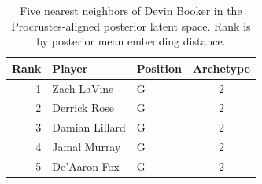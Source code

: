 \begin{table}[htbp]
  \centering\small
  \begin{tabular}{rllc}
    \toprule
    Rank & Player & Position & Archetype \\
    \midrule
    1 & Zach LaVine & G & 2 \\
    2 & Derrick Rose & G & 2 \\
    3 & Damian Lillard & G & 2 \\
    4 & Jamal Murray & G & 2 \\
    5 & De'Aaron Fox & G & 2 \\
    \bottomrule
  \end{tabular}
  \caption{Five nearest neighbors of Devin Booker in the Procrustes-aligned posterior latent space. Rank is by posterior mean embedding distance.}
  \label{tab:Devin_Booker_neighbors}
\end{table}

